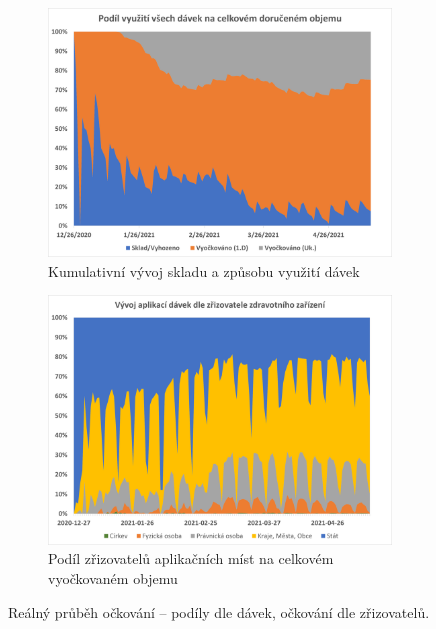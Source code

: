 \begin{figure}
\centering


\begin{subfigure}{0.9\textwidth}
\includegraphics[width=\textwidth]{assets/gr_vyuziti}
\caption{Kumulativní vývoj skladu a způsobu využití dávek}
\label{gr_vyuziti}
\end{subfigure}

\begin{subfigure}{0.9\textwidth}
\includegraphics[width=\textwidth]{assets/chart_zrizovatele}
\caption{Podíl zřizovatelů aplikačních míst na celkovém vyočkovaném objemu}
\label{gr_vyuziti_zrizovatele}
\end{subfigure}

\caption{Reálný průběh očkování -- podíly dle dávek, očkování dle zřizovatelů.}
\end{figure}



